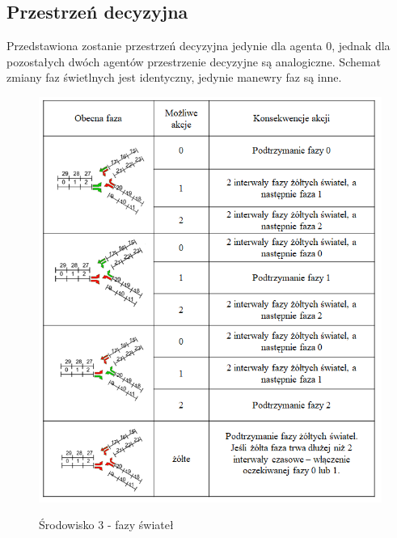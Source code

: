 \documentclass[12pt]{book}
\theoremstyle{plain}
\begin{document}
\subsection{Przestrzeń decyzyjna} \label{subsec_pn_dec}
Przedstawiona zostanie przestrzeń decyzyjna jedynie dla agenta 0, jednak dla pozostałych dwóch agentów przestrzenie decyzyjne są analogiczne. Schemat zmiany faz świetlnych jest identyczny, jedynie manewry faz są inne.
\begin{figure}[H]
	\centering
	\includegraphics[width=14cm]{images/env_14_akcje_agent0_tabela}
	\label{fig:env_4_akcje_agent_0}
	\caption{Środowisko 3 - fazy świateł}
\end{figure}
\end{document}
